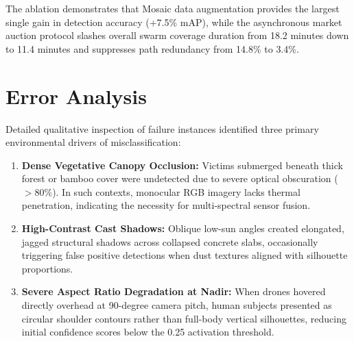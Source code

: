 \begin{table}[htbp]
\centering
\caption{Ablation analysis of individual pipeline components in SARAS}
\label{tab:ablation_results}
\vspace{0.2cm}
\end{table}

The ablation demonstrates that Mosaic data augmentation provides the largest single gain in detection accuracy (+7.5\% mAP), while the asynchronous market auction protocol slashes overall swarm coverage duration from 18.2 minutes down to 11.4 minutes and suppresses path redundancy from 14.8\% to 3.4\%.

\section{Error Analysis}

Detailed qualitative inspection of failure instances identified three primary environmental drivers of misclassification:
\begin{enumerate}
    \item \textbf{Dense Vegetative Canopy Occlusion:} Victims submerged beneath thick forest or bamboo cover were undetected due to severe optical obscuration ($>80\%$). In such contexts, monocular RGB imagery lacks thermal penetration, indicating the necessity for multi-spectral sensor fusion.
    \item \textbf{High-Contrast Cast Shadows:} Oblique low-sun angles created elongated, jagged structural shadows across collapsed concrete slabs, occasionally triggering false positive detections when dust textures aligned with silhouette proportions.
    \item \textbf{Severe Aspect Ratio Degradation at Nadir:} When drones hovered directly overhead at 90-degree camera pitch, human subjects presented as circular shoulder contours rather than full-body vertical silhouettes, reducing initial confidence scores below the 0.25 activation threshold.
\end{enumerate}

